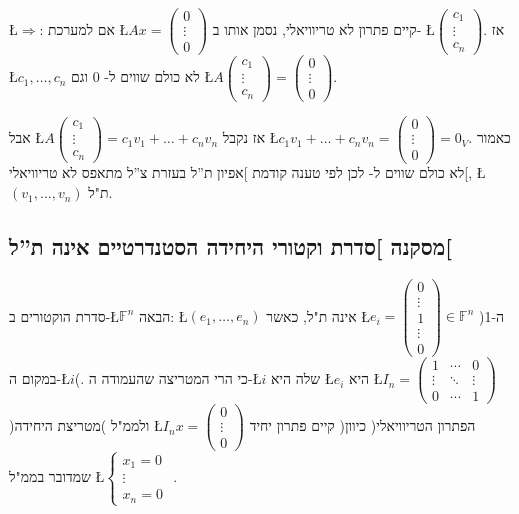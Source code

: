 \documentclass[english,hebrew]{article}
\begin{document}
\L{$\Rightarrow$}: אם למערכת \L{$Ax=\begin{pmatrix}0\\
\vdots\\
0
\end{pmatrix}$} קיים פתרון לא טריוויאלי, נסמן אותו ב- \L{$\begin{pmatrix}c_{1}\\
\vdots\\
c_{n}
\end{pmatrix}$}. אז \L{$c_{1},\dots,c_{n}$} לא כולם שווים ל- 0 וגם \L{$A\begin{pmatrix}c_{1}\\
\vdots\\
c_{n}
\end{pmatrix}=\begin{pmatrix}0\\
\vdots\\
0
\end{pmatrix}$}.

אבל \L{$A\begin{pmatrix}c_{1}\\
\vdots\\
c_{n}
\end{pmatrix}=c_{1}v_{1}+\dots+c_{n}v_{n}$} אז נקבל \L{$c_{1}v_{1}+\dots+c_{n}v_{n}=\begin{pmatrix}0\\
\vdots\\
0
\end{pmatrix}=0_{V}$}. כאמור לא כולם שווים ל- {\endL} לכן לפי טענה קודמת {]}אפיון
ת\textquotedblright ל בעזרת צ\textquotedblright ל מתאפס לא טריוויאלי{[},
\L{$(v_{1},\dots,v_{n})$} ת"ל.

\subsection{מסקנה {]}סדרת וקטורי היחידה הסטנדרטיים אינה ת\textquotedblright ל{[}}

סדרת הוקטורים ב-\L{$\mathbb{F}^{n}$} הבאה: \L{$(e_{1},\dots,e_{n})$}
אינה ת"ל, כאשר \L{$e_{i}=\begin{pmatrix}0\\
\vdots\\
1\\
\vdots\\
0
\end{pmatrix}\in\mathbb{F}^{n}$} )ה-1 במקום ה-\L{$i$}(. כי הרי המטריצה שהעמודה ה-\L{$i$} שלה היא
\L{$e_{i}$} היא \L{$I_{n}=\begin{pmatrix}1 & \cdots & 0\\
\vdots & \ddots & \vdots\\
0 & \cdots & 1
\end{pmatrix}$} )מטריצת היחידה( ולממ"ל \L{$I_{n}x=\begin{pmatrix}0\\
\vdots\\
0
\end{pmatrix}$} קיים פתרון יחיד )הפתרון הטריוויאלי( כיוון שמדובר בממ"ל \L{$\begin{cases}
x_{1}=0\\
\vdots\\
x_{n}=0
\end{cases}$} .\\
\end{document}
